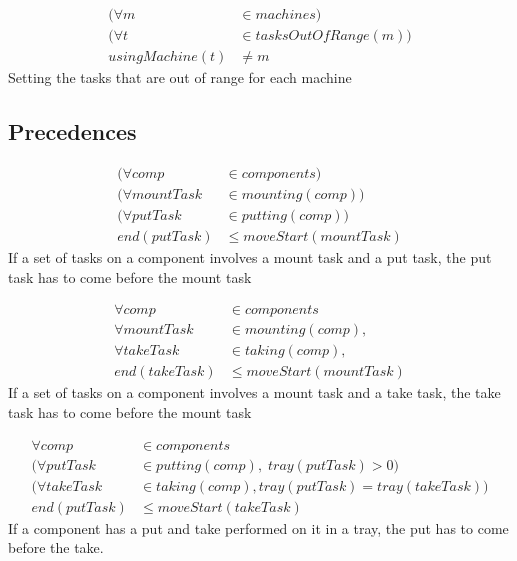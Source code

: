 \begin{equation}\label{eq:95}
 \begin{aligned}
 (\forall m &\in machines) \\
 (\forall t &\in tasksOutOfRange(m)) \\
 usingMachine(t) &\neq m
 \end{aligned}
 \end{equation}
 Setting the tasks that are out of range for each machine
 
 \subsection{Precedences}
 
 \begin{equation}
 \begin{aligned}\label{eq:96}
 (\forall comp &\in components) \\
 (\forall mountTask &\in mounting(comp)) \\
 (\forall putTask &\in putting(comp)) \\
 end(putTask) &\le moveStart(mountTask)
 \end{aligned}
 \end{equation}
 If a set of tasks on a component involves a mount task and a put task, the put task has to come before the mount task
 
 
 \begin{equation}
 \begin{aligned}\label{eq:97}
 \forall comp &\in components \\
 \forall mountTask &\in mounting(comp), \\
 \forall takeTask &\in taking(comp), \\
 end(takeTask) &\le moveStart(mountTask)
 \end{aligned}
 \end{equation}
 If a set of tasks on a component involves a mount task and a take task, the take task has to come before the mount task
 
 
 \begin{equation}
 \begin{aligned}\label{eq:98}
 \forall comp &\in components \\
 (\forall putTask &\in putting(comp), \; tray(putTask) > 0)\\
 (\forall takeTask &\in taking(comp), tray(putTask) = tray(takeTask))\\
 end(putTask) &\le moveStart(takeTask)
 \end{aligned}
 \end{equation}
 If a component has a put and take performed on it in a tray, the put has to come before the take.
 
